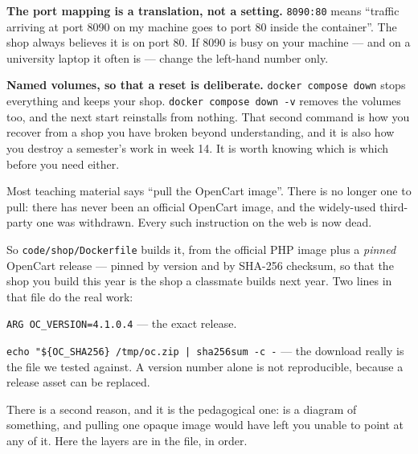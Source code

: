 \textbf{The port mapping is a translation, not a setting.} \texttt{8090:80}
means ``traffic arriving at port 8090 on my machine goes to port 80 inside the
container''. The shop always believes it is on port 80. If 8090 is busy on your
machine --- and on a university laptop it often is --- change the left-hand
number only.

\textbf{Named volumes, so that a reset is deliberate.} \texttt{docker compose
down} stops everything and keeps your shop. \texttt{docker compose down -v}
removes the volumes too, and the next start reinstalls from nothing. That
second command is how you recover from a shop you have broken beyond
understanding, and it is also how you destroy a semester's work in week 14. It
is worth knowing which is which before you need either.

\begin{conceptbox}
Most teaching material says ``pull the OpenCart image''. There is no longer one
to pull: there has never been an official OpenCart image, and the widely-used
third-party one was withdrawn. Every such instruction on the web is now dead.

\smallskip
So \texttt{code/shop/Dockerfile} builds it, from the official PHP image plus a
\emph{pinned} OpenCart release --- pinned by version and by SHA-256 checksum,
so that the shop you build this year is the shop a classmate builds next year.
Two lines in that file do the real work:

\begin{tight}
  \item \texttt{ARG OC\_VERSION=4.1.0.4} --- the exact release.
  \item \texttt{echo "\$\{OC\_SHA256\}  /tmp/oc.zip | sha256sum -c -} --- the
        download really is the file we tested against. A version number alone
        is not reproducible, because a release asset can be replaced.
\end{tight}

\smallskip
There is a second reason, and it is the pedagogical one:  is a
diagram of something, and pulling one opaque image would have left you unable
to point at any of it. Here the layers are in the file, in order.
\end{conceptbox}

